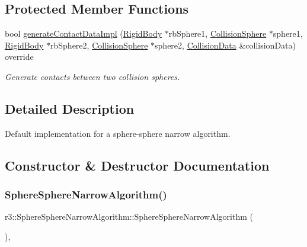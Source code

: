 \subsection*{Protected Member Functions}
\begin{DoxyCompactItemize}
\item 
bool \mbox{\hyperlink{classr3_1_1_sphere_sphere_narrow_algorithm_a3559238de013b2fb8f3786e365e2ace7}{generate\+Contact\+Data\+Impl}} (\mbox{\hyperlink{classr3_1_1_rigid_body}{Rigid\+Body}} $\ast$rb\+Sphere1, \mbox{\hyperlink{classr3_1_1_collision_sphere}{Collision\+Sphere}} $\ast$sphere1, \mbox{\hyperlink{classr3_1_1_rigid_body}{Rigid\+Body}} $\ast$rb\+Sphere2, \mbox{\hyperlink{classr3_1_1_collision_sphere}{Collision\+Sphere}} $\ast$sphere2, \mbox{\hyperlink{classr3_1_1_collision_data}{Collision\+Data}} \&collision\+Data) override
\begin{DoxyCompactList}\small\item\em Generate contacts between two collision spheres. \end{DoxyCompactList}\end{DoxyCompactItemize}


\subsection{Detailed Description}
Default implementation for a sphere-\/sphere narrow algorithm. 

\subsection{Constructor \& Destructor Documentation}
\mbox{\label{classr3_1_1_sphere_sphere_narrow_algorithm_a502f461be63a812401d8d31cf094a143}} 
\subsubsection{\texorpdfstring{Sphere\+Sphere\+Narrow\+Algorithm()}{SphereSphereNarrowAlgorithm()}}
{\footnotesize\ttfamily r3\+::\+Sphere\+Sphere\+Narrow\+Algorithm\+::\+Sphere\+Sphere\+Narrow\+Algorithm (\begin{DoxyParamCaption}{ }\end{DoxyParamCaption})\hspace{0.3cm}{\ttfamily [explicit]}, {\ttfamily [default]}}

